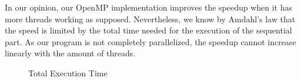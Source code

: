 \documentclass[twocolumn]{article}
\begin{document}
    In our opinion, our OpenMP implementation improves the speedup when it has more threads working as supposed.
    Nevertheless, we know by Amdahl's law that the speed is limited by the total time needed for the execution of the sequential part.
    As our program is not completely parallelized, the speedup cannot increase linearly with the amount of threads.

    \begin{figure}[h]
        \caption{Total Execution Time}
        \label{fig:Ng1}
    \end{figure}

    \begin{table}[!h]
        \caption{\label{tab:time}Total execution time --- \textbf{course cluster}, original
        submission. Not regenerable from this repository.}
        \centering
    \end{table}
\end{document}
